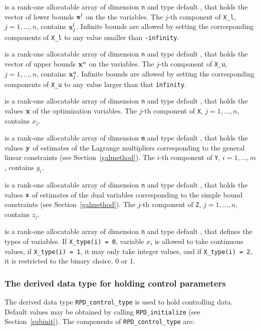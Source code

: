 \documentclass{galahad}
\newcommand{\packagename}{RPD}
\begin{document}
\begin{description}
 is a rank-one allocatable array of dimension {\tt n} and type
default \realdp, that holds
the vector of lower bounds ${\mathbf{x}}^{l}$ on the the variables.
The $j$-th component of {\tt X\_l}, $j = 1, \ldots , n$,
contains ${\mathbf{x}}_{j}^{l}$.
Infinite bounds are allowed by setting the corresponding
components of {\tt X\_l} to any value smaller than {\tt -infinity}.

 is a rank-one allocatable array of dimension {\tt n} and type
default \realdp, that holds
the vector of upper bounds ${\mathbf{x}}^{u}$ on the variables.
The $j$-th component of {\tt X\_u}, $j = 1, \ldots , n$,
contains ${\mathbf{x}}_{j}^{u}$.
Infinite bounds are allowed by setting the corresponding
components of {\tt X\_u} to any value larger than that {\tt infinity}.

 is a rank-one allocatable array of dimension {\tt n} and type
default \realdp,
that holds the values ${\mathbf{x}}$ of the optimization variables.
The $j$-th component of {\tt X}, $j = 1,  \ldots , n$, contains $x_{j}$.

 is a rank-one allocatable array of dimension {\tt m} and type
default \realdp, that holds
the values ${\mathbf{y}}$ of estimates  of the Lagrange multipliers
corresponding to the general linear constraints (see Section~\ref{galmethod}).
The $i$-th component of {\tt Y}, $i = 1,  \ldots ,  m$, contains $y_{i}$.

 is a rank-one allocatable array of dimension {\tt n} and type default
\realdp, that holds
the values ${\mathbf{z}}$ of estimates  of the dual variables
corresponding to the simple bound constraints (see Section~\ref{galmethod}).
The $j$-th component of {\tt Z}, $j = 1,  \ldots ,  n$, contains $z_{j}$.

 is a rank-one allocatable array of dimension {\tt n} and type
default \integer, that defines the types of variables. If {\tt X\_type(i) = 0},
variable $x_i$ is allowed to take continuous values, if {\tt X\_type(i) = 1},
it may only take integer values, and if {\tt X\_type(i) = 2}, it is
restricted to the binary choice, 0 or 1.

\end{description}


\subsubsection{The derived data type for holding control
 parameters}\label{typecontrol}
The derived data type
{\tt \packagename\_control\_type}
is used to hold controlling data. Default values may be obtained by calling
{\tt \packagename\_initialize}
(see Section~\ref{subinit}). The components of
{\tt \packagename\_control\_type}
are:
\end{document}
